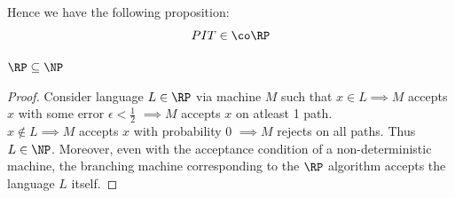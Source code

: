 Hence we have the following proposition:
\begin{equation}
PIT \in \co\RP
\end{equation}

\begin{proposition}
$\RP \subseteq \NP$
\end{proposition}
\begin{proof}
Consider language $L \in \RP$ via machine $M$ such that 
$x \in L \implies M $ accepts $x$ with some error $\epsilon < \frac{1}{2}$
$\implies M $ accepts $x$ on atleast 1 path. \\
$x \notin L \implies M$ accepts $x$ with probability 0 $\implies M$ rejects on all paths.
Thus $L \in \NP$. Moreover, even with the acceptance condition of a non-deterministic machine, the branching machine corresponding to the $\RP$ algorithm accepts the language $L$ itself.
\end{proof}
\vspace{-40mm}
